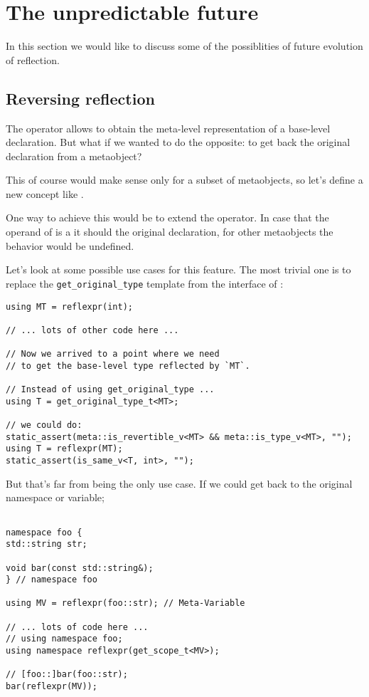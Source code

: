 \section{The unpredictable future}

In this section we would like to discuss some of the possiblities of future
evolution of reflection.

\subsection{Reversing reflection}

The \verb@reflexpr@ operator allows to obtain the meta-level representation
of a base-level declaration. But what if we wanted to do the opposite: to
get back the original declaration from a metaobject?

This of course would make sense only for a subset of metaobjects, so let's
define a new concept like .

One way to achieve this would be to extend the \verb@reflexpr@
operator. In case that the operand of \verb@reflexpr@ is a 
it should  the original declaration, for other metaobjects the behavior
would be undefined.

Let's look at some possible use cases for this feature.
The most trivial one is to replace the \texttt{get\_original\_type}
template from the interface of :

\begin{verbatim}
using MT = reflexpr(int);

// ... lots of other code here ...

// Now we arrived to a point where we need
// to get the base-level type reflected by `MT`.

// Instead of using get_original_type ...
using T = get_original_type_t<MT>;

// we could do:
static_assert(meta::is_revertible_v<MT> && meta::is_type_v<MT>, "");
using T = reflexpr(MT);
static_assert(is_same_v<T, int>, "");

\end{verbatim}

But that's far from being the only use case. If we could get back to
the original namespace or variable;

\begin{verbatim}

namespace foo {
std::string str;

void bar(const std::string&);
} // namespace foo

using MV = reflexpr(foo::str); // Meta-Variable

// ... lots of code here ...
// using namespace foo;
using namespace reflexpr(get_scope_t<MV>);

// [foo::]bar(foo::str);
bar(reflexpr(MV));

\end{verbatim}

